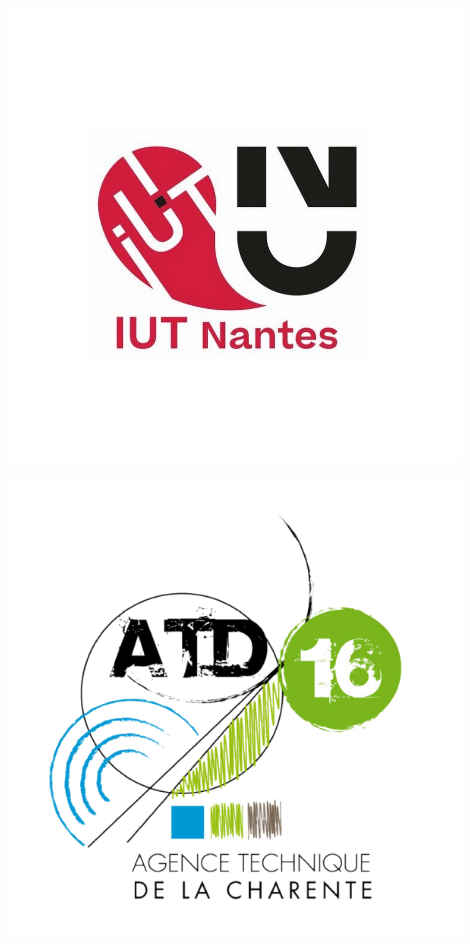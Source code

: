 \documentclass[a4paper,12pt]{report}
\begin{document}
\begin{titlepage}
    \begin{minipage}{0.45\textwidth}
        \includegraphics[width=0.9\textwidth]{images_rapport/logoIUT.jpg}
    \end{minipage}
    \hfill
    \begin{minipage}{0.45\textwidth}
        \flushright
        \includegraphics[width=0.9\textwidth]{images_rapport/logo-atd@3x.png}
    \end{minipage}


\end{titlepage}
\end{document}
